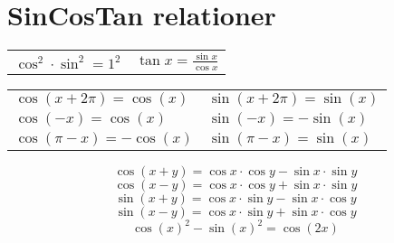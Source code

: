 \section{SinCosTan relationer}
\label{sec:SinCosTan relationer}
\begin{center}
    \bgroup
    \def\arraystretch{1.5}
    \begin{tabular}{cc}
        $\cos^2\cdot\sin^2=1^2$&$\tan{x}=\frac{\sin{x}}{\cos{x}}$
    \end{tabular}
    \egroup
    \end{center}



\begin{center}
    \bgroup
    \def\arraystretch{1.5}
        \begin{tabular}{p{5cm} p{4cm}}
            $\cos(x+2\pi)=\cos(x)$&$\sin(x+2\pi)=\sin(x)$\\
            $\cos(-x)=\cos(x)$&$\sin(-x)=-\sin(x)$\\
            $\cos(\pi-x)=-\cos(x)$&$\sin(\pi-x)=\sin(x)$
        \end{tabular}
    \egroup
\end{center}
\[\cos{(x+y)}=\cos{x}\cdot \cos{y}-\sin{x}\cdot\sin{y}\]
\[\cos{(x-y)}=\cos{x}\cdot \cos{y}+\sin{x}\cdot\sin{y}\]
\[\sin{(x+y)}=\cos{x}\cdot \sin{y}-\sin{x}\cdot\cos{y}\]
\[\sin{(x-y)}=\cos{x}\cdot \sin{y}+\sin{x}\cdot\cos{y}\]
\[\cos{(x)}^2-\sin{(x)}^2=\cos{(2x)}\]
